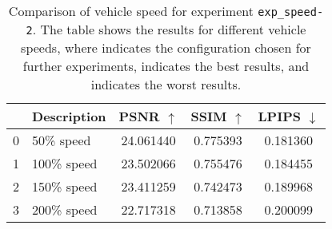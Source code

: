 \begin{table}[ht]
\centering
\setlength{\tabcolsep}{6pt}
\renewcommand{\arraystretch}{1.5}
\begin{tabular}{l l | C{2.2} C{1.3} C{1.3}}
\hline
& \textbf{Description} & \textbf{PSNR $\uparrow$} & \textbf{SSIM $\uparrow$} & \textbf{LPIPS $\downarrow$} \\
\hline
{}0 &50\% speed &  24.061440 &  0.775393 &  0.181360 \\
1 & 100\% speed & 23.502066 & 0.755476 & 0.184455 \\
2 & 150\% speed & 23.411259 & 0.742473 & 0.189968 \\
3 & 200\% speed &  22.717318 &  0.713858 &  0.200099 \\
\hline
\end{tabular}
\caption{Comparison of vehicle speed for experiment \texttt{exp\_speed-2}. The table shows the results for different vehicle speeds, where  indicates the configuration chosen for further experiments,  indicates the best results, and  indicates the worst results.}
\label{tab:exp_speed-2}
\end{table}

